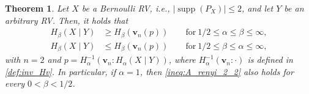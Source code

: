 \documentclass[conference, draftcls, onecolumn]{IEEEtran}
\theoremstyle{plain}
\newtheorem{theorem}{Theorem}
\newcommand{\bvec}[1]{\boldsymbol{#1}}
\newcommand{\supp}{\operatorname{supp}}
\begin{document}
\begin{theorem}
\label{th:A_renyi_2}
Let $X$ be a Bernoulli RV, i.e., $|\!\supp( P_{X} )| \le 2$, and let $Y$ be an arbitrary RV.
Then, it holds that
\begin{align}
H_{\beta}(X \mid Y)
& \ge
H_{\beta}( \bvec{v}_{n}( p ) )
\qquad \mathrm{for} \ 1/2 \le \alpha \le \beta \le \infty ,
\label{ineq:A_renyi_2_1} \\
H_{\beta}(X \mid Y)
& \le
H_{\beta}( \bvec{v}_{n}( p ) )
\qquad \mathrm{for} \ 1/2 \le \beta \le \alpha \le \infty ,
\label{ineq:A_renyi_2_2}
\end{align}
with $n = 2$ and $p = H_{\alpha}^{-1}( \bvec{v}_{n} : H_{\alpha}(X \mid Y) )$, where $H_{\alpha}^{-1}( \bvec{v}_{n} : \cdot )$ is defined in \eqref{def:inv_Hv}.
In particular, if $\alpha = 1$, then \eqref{ineq:A_renyi_2_2} also holds for every $0 < \beta < 1/2$.
\end{theorem}
\end{document}
